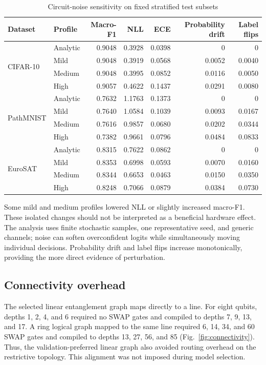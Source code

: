 \documentclass[pdflatex,sn-mathphys-num]{sn-jnl}
\begin{document}
\begin{table}[htbp]
\caption{Circuit-noise sensitivity on fixed stratified test subsets}\label{tab:noise}
\centering
\scriptsize
\begin{tabular}{@{}llrrrrr@{}}
\toprule
\textbf{Dataset} & \textbf{Profile} & \textbf{Macro-F1} & \textbf{NLL} & \textbf{ECE} & \textbf{Probability drift} & \textbf{Label flips} \\
\midrule
\multirow{4}{*}{CIFAR-10} & Analytic & 0.9048 & 0.3928 & 0.0398 & 0 & 0 \\
 & Mild & 0.9048 & 0.3919 & 0.0568 & 0.0052 & 0.0040 \\
 & Medium & 0.9048 & 0.3995 & 0.0852 & 0.0116 & 0.0050 \\
 & High & 0.9057 & 0.4622 & 0.1437 & 0.0291 & 0.0080 \\
\midrule
\multirow{4}{*}{PathMNIST} & Analytic & 0.7632 & 1.1763 & 0.1373 & 0 & 0 \\
 & Mild & 0.7640 & 1.0584 & 0.1039 & 0.0093 & 0.0167 \\
 & Medium & 0.7616 & 0.9857 & 0.0680 & 0.0202 & 0.0344 \\
 & High & 0.7382 & 0.9661 & 0.0796 & 0.0484 & 0.0833 \\
\midrule
\multirow{4}{*}{EuroSAT} & Analytic & 0.8315 & 0.7622 & 0.0862 & 0 & 0 \\
 & Mild & 0.8353 & 0.6998 & 0.0593 & 0.0070 & 0.0160 \\
 & Medium & 0.8344 & 0.6653 & 0.0463 & 0.0150 & 0.0350 \\
 & High & 0.8248 & 0.7066 & 0.0879 & 0.0384 & 0.0730 \\
\bottomrule
\end{tabular}
\end{table}

Some mild and medium profiles lowered NLL or slightly increased macro-F1. These isolated changes should not be interpreted as a beneficial hardware effect. The analysis uses finite stochastic samples, one representative seed, and generic channels; noise can soften overconfident logits while simultaneously moving individual decisions. Probability drift and label flips increase monotonically, providing the more direct evidence of perturbation.

\subsection{Connectivity overhead}

The selected linear entanglement graph maps directly to a line. For eight qubits, depths 1, 2, 4, and 6 required no SWAP gates and compiled to depths 7, 9, 13, and 17. A ring logical graph mapped to the same line required 6, 14, 34, and 60 SWAP gates and compiled to depths 13, 27, 56, and 85 (Fig.~\ref{fig:connectivity}). Thus, the validation-preferred linear graph also avoided routing overhead on the restrictive topology. This alignment was not imposed during model selection.
\end{document}
